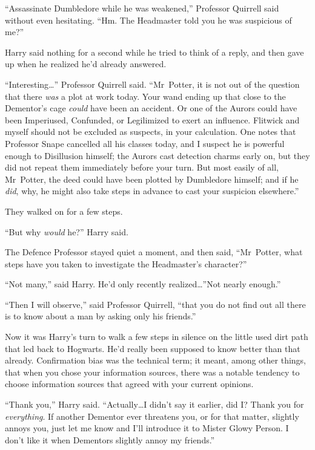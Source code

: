 “Assassinate Dumbledore while he was weakened,” Professor Quirrell said without even hesitating. “Hm. The Headmaster told you he was suspicious of me?”

Harry said nothing for a second while he tried to think of a reply, and then gave up when he realized he’d already answered.

“Interesting…” Professor Quirrell said. “Mr~Potter, it is not out of the question that there \emph{was} a plot at work today. Your wand ending up that close to the Dementor’s cage \emph{could} have been an accident. Or one of the Aurors could have been Imperiused, Confunded, or Legilimized to exert an influence. Flitwick and myself should not be excluded as suspects, in your calculation. One notes that Professor Snape cancelled all his classes today, and I suspect he is powerful enough to Disillusion himself; the Aurors cast detection charms early on, but they did not repeat them immediately before your turn. But most easily of all, Mr~Potter, the deed could have been plotted by Dumbledore himself; and if he \emph{did}, why, he might also take steps in advance to cast your suspicion elsewhere.”

They walked on for a few steps.

“But why \emph{would} he?” Harry said.

The Defence Professor stayed quiet a moment, and then said, “Mr~Potter, what steps have you taken to investigate the Headmaster’s character?”

“Not many,” said Harry. He’d only recently realized…”Not nearly enough.”

“Then I will observe,” said Professor Quirrell, “that you do not find out all there is to know about a man by asking only his friends.”

Now it was Harry’s turn to walk a few steps in silence on the little used dirt path that led back to Hogwarts. He’d really been supposed to know better than that already. Confirmation bias was the technical term; it meant, among other things, that when you chose your information sources, there was a notable tendency to choose information sources that agreed with your current opinions.

“Thank you,” Harry said. “Actually…I didn’t say it earlier, did I? Thank you for \emph{everything}. If another Dementor ever threatens you, or for that matter, slightly annoys you, just let me know and I’ll introduce it to Mister Glowy Person. I don’t like it when Dementors slightly annoy my friends.”

